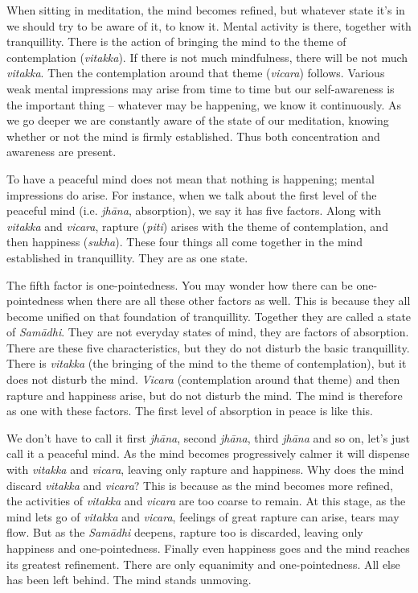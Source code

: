 When sitting in meditation, the mind becomes refined, but whatever state it's in we should try to be aware of it, to know it. Mental activity is there, together with tranquillity. There is the action of bringing the mind to the theme of contemplation (\textit{vitakka}). If there is not much mindfulness, there will be not much \textit{vitakka}. Then the contemplation around that theme (\textit{vicara}) follows. Various weak mental impressions may arise from time to time but our self-awareness is the important thing -- whatever may be happening, we know it continuously. As we go deeper we are constantly aware of the state of our meditation, knowing whether or not the mind is firmly established. Thus both concentration and awareness are present.

To have a peaceful mind does not mean that nothing is happening; mental impressions do arise. For instance, when we talk about the first level of the peaceful mind (i.e. \textit{jh\=ana}, absorption), we say it has five factors. Along with \textit{vitakka} and \textit{vicara}, rapture (\textit{piti}) arises with the theme of contemplation, and then happiness (\textit{sukha}). These four things all come together in the mind established in tranquillity. They are as one state.

The fifth factor is one-pointedness. You may wonder how there can be one-pointedness when there are all these other factors as well. This is because they all become unified on that foundation of tranquillity. Together they are called a state of \textit{Sam\=adhi}. They are not everyday states of mind, they are factors of absorption. There are these five characteristics, but they do not disturb the basic tranquillity. There is \textit{vitakka} (the bringing of the mind to the theme of contemplation), but it does not disturb the mind. \textit{Vicara} (contemplation around that theme) and then rapture and happiness arise, but do not disturb the mind. The mind is therefore as one with these factors. The first level of absorption in peace is like this.

We don't have to call it first \textit{jh\=ana}, second \textit{jh\=ana}, third \textit{jh\=ana} and so on, let's just call it a peaceful mind. As the mind becomes progressively calmer it will dispense with \textit{vitakka} and \textit{vicara}, leaving only rapture and happiness. Why does the mind discard \textit{vitakka} and \textit{vicara}? This is because as the mind becomes more refined, the activities of \textit{vitakka} and \textit{vicara} are too coarse to remain. At this stage, as the mind lets go of \textit{vitakka} and \textit{vicara}, feelings of great rapture can arise, tears may flow. But as the \textit{Sam\=adhi} deepens, rapture too is discarded, leaving only happiness and one-pointedness. Finally even happiness goes and the mind reaches its greatest refinement. There are only equanimity and one-pointedness. All else has been left behind. The mind stands unmoving.

